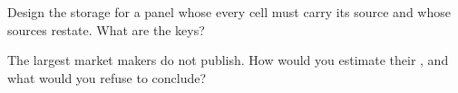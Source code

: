 \begin{interviewq}\label{iq:in:revenue-and-profit-across-the-industry:5}
Design the storage for a panel whose every cell must carry its source and whose sources restate. What are the keys?
\end{interviewq}

\begin{interviewq}\label{iq:in:revenue-and-profit-across-the-industry:6}
The largest market makers do not publish. How would you estimate their , and what would you refuse to
conclude?
\end{interviewq}

